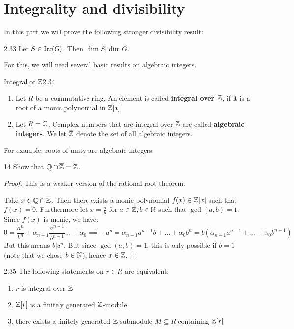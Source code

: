 \documentclass[twoside = false,	%
		headsepline,		%
		parskip = true,
		]{scrbook}						%
\begin{document}
    
\section{Integrality and divisibility}
    In this part we will prove the following stronger divisibility result:
    \begin{proposition}{}{2.33}
        Let $S\in\mathrm{Irr}(G)$. Then $\dim S|\dim G$.
    \end{proposition}
    For this, we will need several basic results on algebraic integers.
    \begin{definition}{Integral of $\mathbb Z$}{2.34}
        \begin{enumerate}
            \item Let $R$ be a commutative ring. An element is called \textbf{integral over $\mathbb Z$}, if it is a root of a monic polynomial in $\mathbb Z[x]$
            \item Let $R=\mathbb C$. Complex numbers that are integral over $\mathbb Z$ are called \textbf{algebraic integers}. We let $\overline{\mathbb Z}$ denote the set of all algebraic integers.
        \end{enumerate}
    \end{definition}
    For example, roots of unity are algebraic integers.
    \begin{exercise}{}{14}
        Show that $\mathbb Q\cap\overline{\mathbb Z} = \mathbb Z$.
    \end{exercise}
    \begin{proof}
        This is a weaker version of the rational root theorem.
        
        Take $x \in \mathbb Q \cap \overline{\mathbb Z}$. Then there exists a monic polynomial $f(x) \in \mathbb Z[x]$ such that $f(x) = 0$. Furthermore let $x = \frac{a}{b}$ for $a \in \mathbb Z, b \in \mathbb N$ such that $\gcd(a,b) = 1$. Since $f(x)$ is monic, we have:
        \begin{equation*}
            0 = \frac{a^n}{b^n} + \alpha_{n-1} \frac{a^{n-1}}{b^{n-1}}\dots + \alpha_0 \implies -a^n = \alpha_{n-1} a^{n-1}b + \dots + \alpha_0 b^n = b(\alpha_{n-1} a^{n-1} + \dots + \alpha_0 b^{n-1})
        \end{equation*}
        But this means $b | a^n$. But since $\gcd(a,b) = 1$, this is only possible if $b = 1$ (note that we chose $b \in \mathbb N$), hence $x \in \mathbb Z$.
    \end{proof}
    \begin{lemma}{}{2.35}
        The following statements on $r\in R$ are equivalent:
        \begin{enumerate}
            \item $r$ is integral over $\mathbb Z$
            \item $\mathbb Z[r]$ is a finitely generated $\mathbb Z$-module
            \item there exists a finitely generated $\mathbb Z$-submodule $M\subseteq R$ containing $\mathbb Z[r]$
        \end{enumerate}
    \end{lemma}
\end{document}
